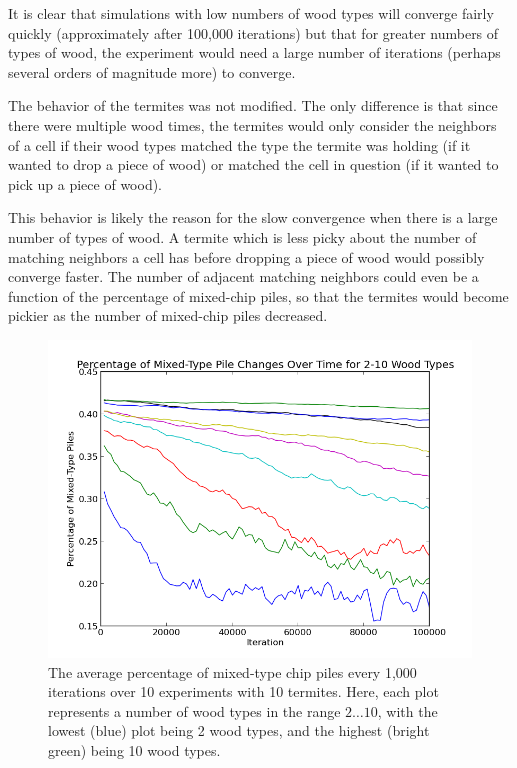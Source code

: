 \documentclass{article}
\begin{document}
\begin{enumerate}
It is clear that simulations with low numbers of wood types will converge fairly
quickly (approximately after 100,000 iterations) but that for greater numbers of
types of wood, the experiment would need a large number of iterations (perhaps
several orders of magnitude more) to converge.

The behavior of the termites was not modified. The only difference is that since
there were multiple wood times, the termites would only consider the neighbors
of a cell if their wood types matched the type the termite was holding (if it
wanted to drop a piece of wood) or matched the cell in question (if it wanted to
pick up a piece of wood).

This behavior is likely the reason for the slow convergence when there is a
large number of types of wood. A termite which is less picky about the number of
matching neighbors a cell has before dropping a piece of wood would possibly
converge faster. The number of adjacent matching neighbors could even be a
function of the percentage of mixed-chip piles, so that the termites would
become pickier as the number of mixed-chip piles decreased.

\begin{figure}[H]
\centering
\includegraphics[width=\textwidth]{figs/part_7.png}
\caption{The average percentage of mixed-type chip piles every 1,000 iterations
over 10 experiments with 10 termites. Here, each plot represents a number of
wood types in the range $2 \ldots 10$, with the lowest (blue) plot being 2 wood
types, and the highest (bright green) being 10 wood types.}
\end{figure}


\end{enumerate}
\end{document}
